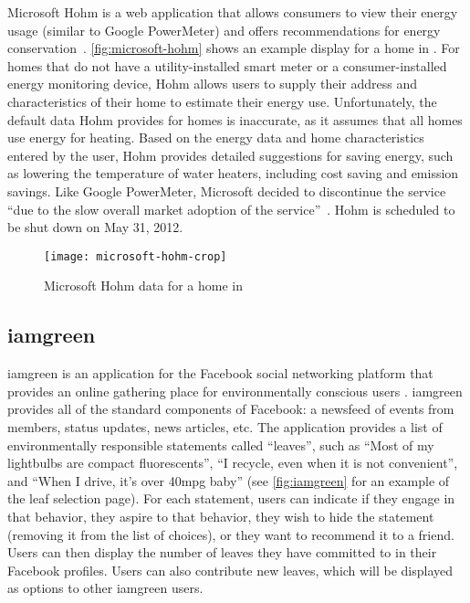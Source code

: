 Microsoft Hohm is a web application that allows consumers to view their energy usage (similar to Google PowerMeter) and offers recommendations for energy conservation~\cite{MS-Hohm-website}. \autoref{fig:microsoft-hohm} shows an example display for a home in \Hawaii. For homes that do not have a utility-installed smart meter or a consumer-installed energy monitoring device, Hohm allows users to supply their address and characteristics of their home to estimate their energy use. Unfortunately, the default data Hohm provides for \Hawaii homes is inaccurate, as it assumes that all homes use energy for heating. Based on the energy data and home characteristics entered by the user, Hohm provides detailed suggestions for saving energy, such as lowering the temperature of water heaters, including cost saving and \COtwo emission savings. Like Google PowerMeter, Microsoft decided to discontinue the service ``due to the slow overall market adoption of the service''~\cite{Hohm-discontinued}. Hohm is scheduled to be shut down on May 31, 2012.

\begin{figure}[htbp]
	\centering
		\texttt{[image: microsoft-hohm-crop]}
		\caption{Microsoft Hohm data for a home in \Hawaii}
		\label{fig:microsoft-hohm}
\end{figure}


\subsection{iamgreen}
\label{sec:iamgreen}

iamgreen is an application for the Facebook social networking platform that provides an online gathering place for environmentally conscious users \cite{iamgreen-website}. iamgreen provides all of the standard components of Facebook: a newsfeed of events from members, status updates, news articles, etc. The application provides a list of environmentally responsible statements called ``leaves'', such as ``Most of my lightbulbs are compact fluorescents'', ``I recycle, even when it is not convenient'', and ``When I drive, it's over 40mpg baby'' (see \autoref{fig:iamgreen} for an example of the leaf selection page). For each statement, users can indicate if they engage in that behavior, they aspire to that behavior, they wish to hide the statement (removing it from the list of choices), or they want to recommend it to a friend. Users can then display the number of leaves they have committed to in their Facebook profiles. Users can also contribute new leaves, which will be displayed as options to other iamgreen users.

